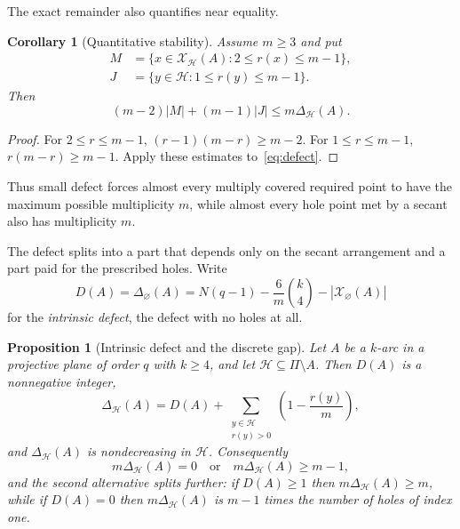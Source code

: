 \documentclass[11pt]{article}
\newtheorem{proposition}[theorem]{Proposition}
\newtheorem{corollary}[theorem]{Corollary}
\theoremstyle{definition}
\theoremstyle{remark}
\newcommand{\cH}{\mathcal{H}}
\newcommand{\cX}{\mathcal{X}}
\begin{document}
The exact remainder also quantifies near equality.

\begin{corollary}[Quantitative stability]
\label{cor:stability}
Assume $m\ge3$ and put
\begin{align*}
 M&=\{x\in\cX_{\cH}(A):2\le r(x)\le m-1\},\\
 J&=\{y\in\cH:1\le r(y)\le m-1\}.
\end{align*}
Then
\begin{equation}
 (m-2)|M|+(m-1)|J|\le m\Delta_{\cH}(A).
\label{eq:stability}
\end{equation}
\end{corollary}

\begin{proof}
For $2\le r\le m-1$,
$(r-1)(m-r)\ge m-2$.  For $1\le r\le m-1$,
$r(m-r)\ge m-1$.  Apply these estimates to~\eqref{eq:defect}.
\end{proof}

Thus small defect forces almost every multiply covered required point to
have the maximum possible multiplicity $m$, while almost every hole point
met by a secant also has multiplicity $m$.

The defect splits into a part that depends only on the secant arrangement
and a part paid for the prescribed holes.  Write
\[
 D(A)=\Delta_{\varnothing}(A)
 =N(q-1)-\frac6m\binom{k}{4}-|\cX_{\varnothing}(A)|
\]
for the \emph{intrinsic defect}, the defect with no holes at all.

\begin{proposition}[Intrinsic defect and the discrete gap]
\label{prop:intrinsic-defect}
Let $A$ be a $k$-arc in a projective plane of order $q$ with $k\ge4$, and
let $\cH\subseteq\Pi\setminus A$.  Then $D(A)$ is a nonnegative integer,
\begin{equation}
 \Delta_{\cH}(A)=D(A)+\sum_{\substack{y\in\cH\\ r(y)>0}}
 \left(1-\frac{r(y)}m\right),
\label{eq:intrinsic-split}
\end{equation}
and $\Delta_{\cH}(A)$ is nondecreasing in $\cH$.  Consequently
\begin{equation}
 m\Delta_{\cH}(A)=0
 \quad\text{or}\quad
 m\Delta_{\cH}(A)\ge m-1,
\label{eq:gap}
\end{equation}
and the second alternative splits further: if $D(A)\ge1$ then
$m\Delta_{\cH}(A)\ge m$, while if $D(A)=0$ then $m\Delta_{\cH}(A)$ is
$m-1$ times the number of holes of index one.
\end{proposition}
\end{document}
